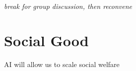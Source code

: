 \documentclass[aspectratio=43,17pt]{beamer} %
\begin{document}
\begin{frame}[plain,label=break]
\centering

\emph{break for group discussion, then reconvene}

\end{frame}




\section{Social Good}

\begin{frame}[standout]

AI will allow us to scale social welfare

\end{frame}
\end{document}
